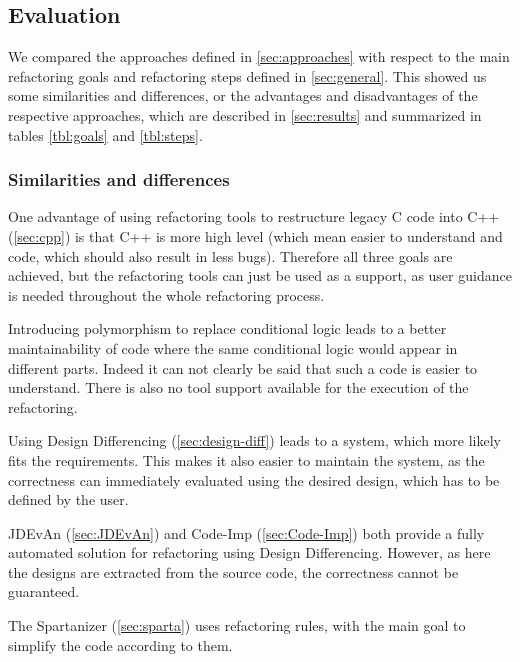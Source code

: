 \documentclass[conference,compsoc,a4paper]{IEEEtran}
\begin{document}
\subsection{Evaluation}

We compared the approaches defined in \autoref{sec:approaches} with respect to the main refactoring goals and refactoring steps defined in \autoref{sec:general}. This showed us some similarities and differences, or the advantages and disadvantages of the respective approaches, which are described in \autoref{sec:results} and summarized in tables \ref{tbl:goals} and \ref{tbl:steps}.

\subsubsection{Similarities and differences} \label{sec:results}

One advantage of using refactoring tools to restructure legacy C code into C++ (\autoref{sec:cpp}) is that C++ is more high level (which mean easier to understand and code, which should also result in less bugs). Therefore all three goals are achieved, but the refactoring tools can just be used as a support, as user guidance is needed throughout the whole refactoring process.

Introducing polymorphism to replace conditional logic leads to a better maintainability of code where the same conditional logic would appear in different parts. Indeed it can not clearly be said that such a code is easier to understand. There is also no tool support available for the execution of the refactoring.

Using Design Differencing (\autoref{sec:design-diff}) leads to a system, which more likely fits the requirements. This makes it also easier to maintain the system, as the correctness can immediately evaluated using the desired design, which has to be defined by the user.

JDEvAn (\autoref{sec:JDEvAn}) and Code-Imp (\autoref{sec:Code-Imp}) both provide a fully automated solution for refactoring using Design Differencing. However, as here the designs are extracted from the source code, the correctness cannot be guaranteed.

The Spartanizer (\autoref{sec:sparta}) uses refactoring rules, with the main goal to simplify the code according to them.
\end{document}
